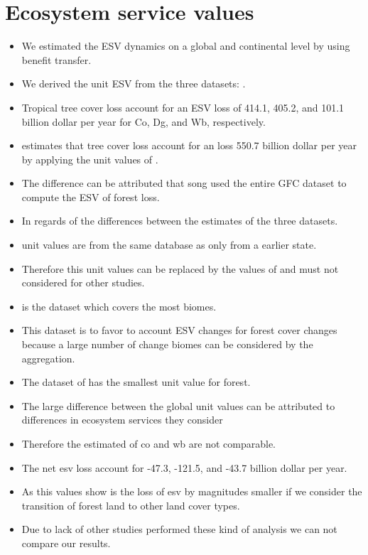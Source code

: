 	\section{Ecosystem service values}
		\begin{itemize}
			\item We estimated the \ac{ESV} dynamics on a global and continental level by using benefit transfer.
			\item We derived the unit \ac{ESV} from the three datasets: \citet{Costanza2014,Groot2012,Siikamaki2015}.
			\item Tropical tree cover loss account for an \ac{ESV} loss of 414.1, 405.2, and 101.1 billion dollar per year for Co, Dg, and Wb, respectively.
			\item \citep{Song2018} estimates that tree cover loss account for an loss 550.7 billion dollar per year by applying the unit values of \citet{Costanza2014}.
			\item The difference can be attributed that song used the entire \ac{GFC} dataset to compute the \ac{ESV} of forest loss.
			\item In regards of the differences between the estimates of the three datasets.
			\item \citep{Groot2012} unit values are from the same database as \citep{Costanza2014} only from a earlier state.
			\item Therefore this unit values can be replaced by the values of \citep{Costanza2014} and must not considered for other studies.
			\item \citep{Costanza2014} is the dataset which covers the most biomes.
			\item This dataset is to favor to account \ac{ESV} changes for forest cover changes because a large number of change biomes can be considered by the aggregation. 
			\item The dataset of \citep{Siikamaki2015} has the smallest unit value for forest.
			\item The large difference between the global unit values can be attributed to differences in ecosystem services they consider
			\item Therefore the estimated of co and wb are not comparable.
			\item The net esv loss account for -47.3, -121.5, and -43.7 billion dollar per year.
			\item As this values show is the loss of esv by magnitudes smaller if we consider the transition of forest land to other land cover types.
			\item Due to lack of other studies performed these kind of analysis we can not compare our results.

\end{itemize}
